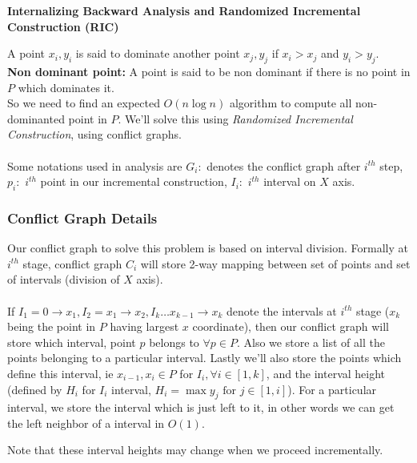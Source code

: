 \documentclass[a4paper]{article}
\begin{document}
\begin{question}[]
\textbf{Internalizing Backward Analysis and Randomized Incremental Construction (RIC)}
\end{question}
A point $x_i, y_i$ is said to dominate another point $x_j, y_j$ if $x_i > x_j$ and $y_i > y_j$. \\
\textbf{Non dominant point: } A point is said to be non dominant if there is no point in $P$ which dominates it. \\
So we need to find an expected $O(n\log n)$ algorithm to compute all non-dominanted point in $P$. We'll solve this using \textit{Randomized Incremental Construction}, using conflict graphs. \\ \\

Some notations used in analysis are $G_i: $ denotes the conflict graph after $i^{th}$ step, $p_i: $ $i^{th}$ point in our incremental construction, $I_i: $ $i^{th}$ interval on $X$ axis.

\subsubsection*{Conflict Graph Details}
Our conflict graph to solve this problem is based on interval division. Formally at $i^{th}$ stage, conflict graph $C_i$ will store 2-way mapping between set of points and set of intervals (division of $X$ axis). \\ \\ 
If $I_1 = 0\rightarrow x_1, I_2 = x_1 \rightarrow x_2, I_k \ldots x_{k-1} \rightarrow x_{k}$ denote the intervals at $i^{th}$ stage ($x_k$ being the point in $P$ having largest $x$ coordinate), then our conflict graph will store which interval, point $p$ belongs to $\forall p \in P$. Also we store a list of all the points belonging to a particular interval. Lastly we'll also store the points which define this interval, ie $x_{i-1}, x_i\in P$ for $I_i, \forall i \in [1,k]$, and the interval height (defined by $H_{i}$ for $I_i$ interval, $H_i = \max y_j \text{ for } j \in [1,i]$). For a particular interval, we store the interval which is just left to it, in other words we can get the left neighbor of a interval in $O(1)$. 

Note that these interval heights may change when we proceed incrementally.\\ \\
\end{document}
